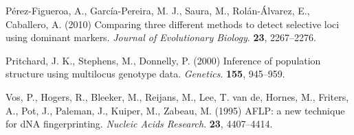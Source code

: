 \documentclass[11pt,]{article}
\begin{document}
P{é}rez-Figueroa, A., Garc{í}a-Pereira, M. J., Saura, M.,
Rol{á}n-{Á}lvarez, E., Caballero, A. (2010) Comparing three different
methods to detect selective loci using dominant markers. \emph{Journal
of Evolutionary Biology}. \textbf{23}, 2267--2276.

Pritchard, J. K., Stephens, M., Donnelly, P. (2000) Inference of
population structure using multilocus genotype data. \emph{Genetics}.
\textbf{155}, 945--959.

Vos, P., Hogers, R., Bleeker, M., Reijans, M., Lee, T. van de, Hornes,
M., Friters, A., Pot, J., Paleman, J., Kuiper, M., Zabeau, M. (1995)
AFLP: a new technique for dNA fingerprinting. \emph{Nucleic Acids
Research}. \textbf{23}, 4407--4414.



\end{document}
